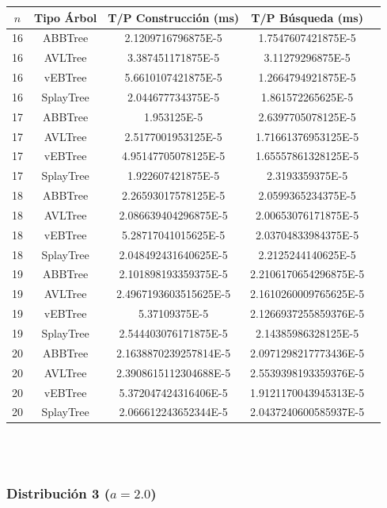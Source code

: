 \documentclass[letterpaper,12pt]{article}
\begin{document}
\begin{tabular}{|c|c|c|c|c|}
\hline
\textbf{$n$} & \textbf{Tipo Árbol} & \textbf{T/P Construcción (ms)} & \textbf{T/P Búsqueda (ms)} \\
\hline
16 & ABBTree & 2.1209716796875E-5 & 1.7547607421875E-5 \\
\hline
16 & AVLTree & 3.387451171875E-5  & 3.11279296875E-5 \\
\hline
16 & vEBTree & 5.6610107421875E-5  & 1.2664794921875E-5 \\
\hline
16 & SplayTree & 2.044677734375E-5 & 1.861572265625E-5 \\
\hline
\hline
17 & ABBTree & 1.953125E-5  & 2.6397705078125E-5 \\
\hline
17 & AVLTree & 2.5177001953125E-5 & 1.71661376953125E-5 \\
\hline
17 & vEBTree & 4.95147705078125E-5  & 1.65557861328125E-5\\
\hline
17 & SplayTree & 1.922607421875E-5 & 2.3193359375E-5 \\
\hline
\hline
18 & ABBTree & 2.26593017578125E-5 & 2.0599365234375E-5 \\
\hline
18 & AVLTree & 2.086639404296875E-5 & 2.00653076171875E-5 \\
\hline
18 & vEBTree & 5.28717041015625E-5 & 2.03704833984375E-5 \\
\hline
18 & SplayTree & 2.048492431640625E-5  & 2.2125244140625E-5 \\
\hline
\hline
19 & ABBTree & 2.101898193359375E-5 & 2.2106170654296875E-5 \\
\hline
19 & AVLTree & 2.4967193603515625E-5  & 2.1610260009765625E-5 \\
\hline
19 & vEBTree & 5.37109375E-5 & 2.1266937255859376E-5\\
\hline
19 & SplayTree & 2.544403076171875E-5 & 2.14385986328125E-5 \\
\hline
\hline
20 & ABBTree & 2.1638870239257814E-5 & 2.0971298217773436E-5 \\
\hline
20 & AVLTree & 2.3908615112304688E-5 & 2.5539398193359376E-5 \\
\hline
20 & vEBTree & 5.372047424316406E-5 & 1.9121170043945313E-5\\
\hline
20 & SplayTree & 2.066612243652344E-5 & 2.0437240600585937E-5 \\
\hline
\end{tabular}
\\ \\

\subsubsection{Distribución 3 ($a=2.0$)}
\end{document}
